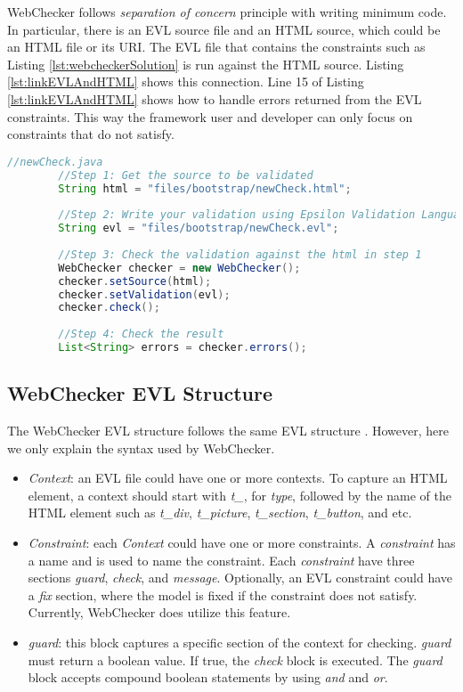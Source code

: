 \documentclass[conference]{IEEETran}
\begin{document}
WebChecker follows \textit{separation of concern} principle with writing minimum code. In particular, there is an EVL source file and an HTML source, which could be an HTML file or its URI. The EVL file that contains the constraints such as Listing \ref{lst:webcheckerSolution} is run against the HTML source. Listing \ref{lst:linkEVLAndHTML} shows this connection. Line 15 of Listing \ref{lst:linkEVLAndHTML} shows how to handle errors returned from the EVL constraints. This way the framework user and developer can only focus on constraints that do not satisfy.   

\begin{lstlisting}[language=Java, caption=Checking an EVL file against an HTML source file, label={lst:linkEVLAndHTML}]
 	//newCheck.java    
		//Step 1: Get the source to be validated
		String html = "files/bootstrap/newCheck.html";
		
		//Step 2: Write your validation using Epsilon Validation Language
		String evl = "files/bootstrap/newCheck.evl";
		
		//Step 3: Check the validation against the html in step 1
		WebChecker checker = new WebChecker();
		checker.setSource(html);
		checker.setValidation(evl);
		checker.check();
		
		//Step 4: Check the result
		List<String> errors = checker.errors();


\end{lstlisting}

\subsection{WebChecker EVL Structure}
The WebChecker EVL structure follows the same EVL structure \cite{Kolovos2009}. However, here we only explain the syntax used by WebChecker. 
\begin{itemize}
\item \textit{Context}: an EVL file could have one or more contexts. To capture an HTML element, a context should start with \textit{t\_}, for \textit{type}, followed by the name of the HTML element such as \textit{t\_div}, \textit{t\_picture}, \textit{t\_section}, \textit{t\_button}, and etc.
\item \textit{Constraint}: each \textit{Context} could have one or more constraints. A \textit{constraint} has a name and is used to name the constraint. Each \textit{constraint} have three sections \textit{guard}, \textit{check}, and \textit{message}. Optionally, an EVL constraint could have a \textit{fix} section, where the model is fixed if the constraint does not satisfy. Currently, WebChecker does utilize this feature.
\item \textit{guard}: this block captures a specific section of the context for checking. \textit{guard} must return a boolean value. If true, the \textit{check} block is executed. The \textit{guard} block accepts compound boolean statements by using \textit{and} and \textit{or}.      
\end{itemize}
\end{document}
